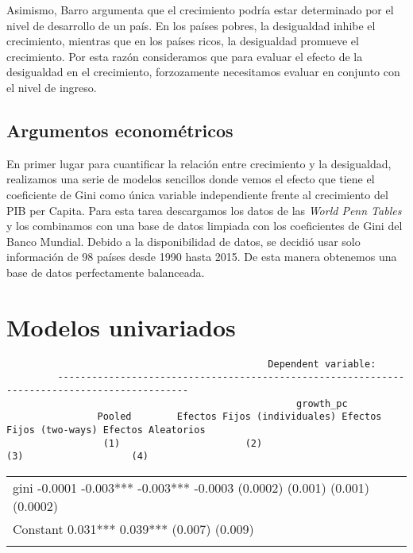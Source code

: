 \documentclass[
  11pt,
]{article}
\begin{document}
Asimismo, Barro argumenta que el crecimiento podría estar determinado
por el nivel de desarrollo de un país. En los países pobres, la
desigualdad inhibe el crecimiento, mientras que en los países ricos, la
desigualdad promueve el crecimiento. Por esta razón consideramos que
para evaluar el efecto de la desigualdad en el crecimiento, forzozamente
necesitamos evaluar en conjunto con el nivel de ingreso.

\hypertarget{argumentos-economuxe9tricos}{%
\subsection{Argumentos
econométricos}\label{argumentos-economuxe9tricos}}

En primer lugar para cuantificar la relación entre crecimiento y la
desigualdad, realizamos una serie de modelos sencillos donde vemos el
efecto que tiene el coeficiente de Gini como única variable
independiente frente al crecimiento del PIB per Capita. Para esta tarea
descargamos los datos de las \emph{World Penn Tables} y los combinamos
con una base de datos limpiada con los coeficientes de Gini del Banco
Mundial. Debido a la disponibilidad de datos, se decidió usar solo
información de 98 países desde 1990 hasta 2015. De esta manera obtenemos
una base de datos perfectamente balanceada.

\hypertarget{modelos-univariados}{%
\section{Modelos univariados}\label{modelos-univariados}}

\begin{verbatim}
                                              Dependent variable:                                     
         ---------------------------------------------------------------------------------------------
                                                   growth_pc                                          
                Pooled        Efectos Fijos (individuales) Efectos Fijos (two-ways) Efectos Aleatorios
                 (1)                      (2)                        (3)                   (4)        
\end{verbatim}

\begin{longtable}[]{@{}
  >{\raggedright\arraybackslash}p{}@{}}
\toprule
\endhead
gini -0.0001 -0.003*** -0.003*** -0.0003 (0.0002) (0.001) (0.001)
(0.0002) \\ \addlinespace
Constant 0.031*** 0.039*** (0.007) (0.009) \\ \addlinespace
\bottomrule
\end{longtable}
\end{document}
